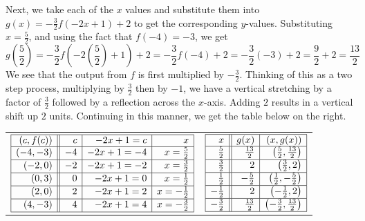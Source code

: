 \documentclass{ximera}
\begin{document}
\begin{example}
 \smallskip

Next, we take each of the $x$ values and substitute them into $g(x) = -\frac{3}{2}f(-2x+1) +2$ to get the corresponding $y$-values.  Substituting  $x=\frac{5}{2}$, and using the fact that $f(-4)=-3$, we get \[g\left(\frac{5}{2}\right) = -\frac{3}{2}f\left(-2\left(\frac{5}{2}\right) +1\right) +2 = -\frac{3}{2} f(-4) + 2 = -\frac{3}{2}(-3) + 2 = \frac{9}{2} + 2 = \frac{13}{2}\]  We see that the output from $f$ is first multiplied by $-\frac{3}{2}$.  Thinking of this as a two step process, multiplying by $\frac{3}{2}$ then by $-1$, we have  a vertical stretching by a factor of $\frac{3}{2}$ followed by a reflection across the $x$-axis.  Adding $2$ results in a vertical shift up $2$ units.  Continuing in this manner, we get the table below on the right.

\begin{center}

\begin{tabular}{cc}

$\begin{array}{|r||r|r|r|}  

\hline

(c,f(c))& c & -2x+1=c & x \\ \hline
(-4,-3) & -4 & -2x+1 = -4 & x = \frac{5}{2} \\ [1pt] \hline
(-2,0) &  -2 &  -2x+1 = -2 & x = \frac{3}{2} \\  [1pt] \hline
(0,3) & 0  & -2x+1 = 0 &  x = \frac{1}{2} \\ [1pt] \hline
(2,0)  & 2 & -2x+1 = 2  &  x = -\frac{1}{2} \\[1pt] \hline
(4,-3) & 4 & -2x+1 = 4  & x = -\frac{3}{2}  \\ [1pt] \hline

\end{array}$

&

$\begin{array}{|r||r|r|}  

\hline

 x & g(x) &  (x, g(x)) \\ \hline
\frac{5}{2}  & \frac{13}{2} &  \left(\frac{5}{2}, \frac{13}{2} \right) \\ [1pt] \hline
\frac{3}{2}  & 2 & \left(\frac{3}{2}, 2 \right)\\ [1pt] \hline
\frac{1}{2}  & - \frac{5}{2} & \left(\frac{1}{2}, -\frac{5}{2} \right)  \\ [1pt] \hline
-\frac{1}{2} & 2 &  \left(-\frac{1}{2}, 2 \right) \\ [1pt] \hline
-\frac{3}{2} & \frac{13}{2} &  \left(-\frac{3}{2}, \frac{13}{2} \right) \\ [1pt] \hline
\end{array}$


\end{tabular}
\end{center}
\end{example}
\end{document}
